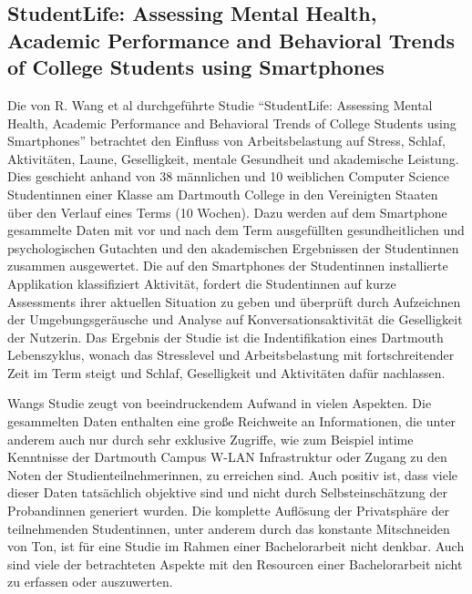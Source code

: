 \subsection*{StudentLife: Assessing Mental Health, Academic Performance and Behavioral Trends of College Students using Smartphones}

Die von R. Wang et al durchgeführte Studie "`StudentLife: Assessing Mental Health, Academic Performance and Behavioral Trends of College Students using Smartphones"'
betrachtet den Einfluss von Arbeitsbelastung auf Stress, Schlaf, Aktivitäten, Laune, Geselligkeit, mentale Gesundheit und akademische Leistung.
Dies geschieht anhand von 38 männlichen und 10 weiblichen Computer Science Studentinnen einer Klasse am Dartmouth College in den Vereinigten Staaten über den Verlauf eines Terms (10 Wochen).
Dazu werden auf dem Smartphone gesammelte Daten mit vor und nach dem Term ausgefüllten gesundheitlichen und psychologischen Gutachten und den akademischen Ergebnissen der Studentinnen zusammen ausgewertet.
Die auf den Smartphones der Studentinnen installierte Applikation klassifiziert Aktivität, fordert die Studentinnen auf kurze Assessments ihrer aktuellen Situation zu geben und überprüft durch Aufzeichnen der Umgebungsgeräusche und Analyse auf Konversationsaktivität die Geselligkeit der Nutzerin.
Das Ergebnis der Studie ist die Indentifikation eines Dartmouth Lebenszyklus, wonach das Stresslevel und Arbeitsbelastung mit fortschreitender Zeit im Term steigt und Schlaf, Geselligkeit und Aktivitäten dafür nachlassen.
\par
Wangs Studie zeugt von beeindruckendem Aufwand in vielen Aspekten. 
Die gesammelten Daten enthalten eine große Reichweite an Informationen, die unter anderem auch nur durch sehr exklusive Zugriffe, wie zum Beispiel intime Kenntnisse der Dartmouth Campus W-LAN Infrastruktur oder Zugang zu den Noten der Studienteilnehmerinnen, zu erreichen sind.
Auch positiv ist, dass viele dieser Daten tatsächlich objektive sind und nicht durch Selbsteinschätzung der Probandinnen generiert wurden.
Die komplette Auflösung der Privatsphäre der teilnehmenden Studentinnen, unter anderem durch das konstante Mitschneiden von Ton, ist für eine Studie im Rahmen einer Bachelorarbeit nicht denkbar. 
Auch sind viele der betrachteten Aspekte mit den Resourcen einer Bachelorarbeit nicht zu erfassen oder auszuwerten.





